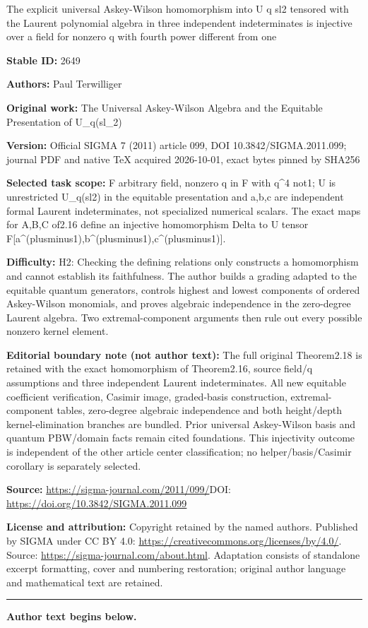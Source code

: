 \documentclass[11pt]{article}
\numberwithin{equation}{section}
\begin{document}
\begin{center}\Large The explicit universal Askey-Wilson homomorphism into U q sl2 tensored with the Laurent polynomial algebra in three independent indeterminates is injective over a field for nonzero q with fourth power different from one\end{center}
\noindent\textbf{Stable ID:} 2649\par
\noindent\textbf{Authors:} Paul Terwilliger\par
\noindent\textbf{Original work:} The Universal Askey-Wilson Algebra and the Equitable Presentation of U\_q(sl\_2)\par
\noindent\textbf{Version:} Official SIGMA 7 (2011) article 099, DOI 10.3842/SIGMA.2011.099; journal PDF and native TeX acquired 2026-10-01, exact bytes pinned by SHA256\par
\noindent\textbf{Selected task scope:} F arbitrary field, nonzero q in F with q\textasciicircum{}4 not1; U is unrestricted U\_q(sl2) in the equitable presentation and a,b,c are independent formal Laurent indeterminates, not specialized numerical scalars. The exact maps for A,B,C of2.16 define an injective homomorphism Delta to U tensor F[a\textasciicircum{}(plusminus1),b\textasciicircum{}(plusminus1),c\textasciicircum{}(plusminus1)].\par
\noindent\textbf{Difficulty:} H2: Checking the defining relations only constructs a homomorphism and cannot establish its faithfulness. The author builds a grading adapted to the equitable quantum generators, controls highest and lowest components of ordered Askey-Wilson monomials, and proves algebraic independence in the zero-degree Laurent algebra. Two extremal-component arguments then rule out every possible nonzero kernel element.\par
\noindent\textbf{Editorial boundary note (not author text):} The full original Theorem2.18 is retained with the exact homomorphism of Theorem2.16, source field/q assumptions and three independent Laurent indeterminates. All new equitable coefficient verification, Casimir image, graded-basis construction, extremal-component tables, zero-degree algebraic independence and both height/depth kernel-elimination branches are bundled. Prior universal Askey-Wilson basis and quantum PBW/domain facts remain cited foundations. This injectivity outcome is independent of the other article center classification; no helper/basis/Casimir corollary is separately selected.\par
\noindent\textbf{Source:} \url{https://sigma-journal.com/2011/099/}\quad DOI: \url{https://doi.org/10.3842/SIGMA.2011.099}\par
\noindent\textbf{License and attribution:} Copyright retained by the named authors. Published by SIGMA under CC BY 4.0: \url{https://creativecommons.org/licenses/by/4.0/}. Source: \url{https://sigma-journal.com/about.html}. Adaptation consists of standalone excerpt formatting, cover and numbering restoration; original author language and mathematical text are retained.\par
\medskip\hrule\medskip\noindent\textbf{Author text begins below.}\par
\setcounter{section}{1}
\setcounter{subsection}{0}
\setcounter{subsubsection}{0}
\setcounter{Theorem}{1}
\setcounter{equation}{4}
\end{document}
